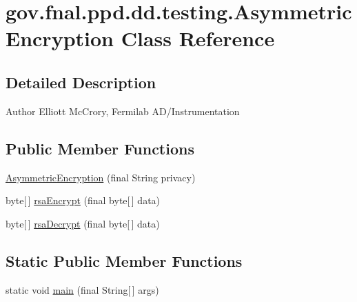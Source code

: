 \hypertarget{classgov_1_1fnal_1_1ppd_1_1dd_1_1testing_1_1AsymmetricEncryption}{\section{gov.\-fnal.\-ppd.\-dd.\-testing.\-Asymmetric\-Encryption Class Reference}
\label{classgov_1_1fnal_1_1ppd_1_1dd_1_1testing_1_1AsymmetricEncryption}
}


\subsection{Detailed Description}
\begin{DoxyAuthor}{Author}
Elliott Mc\-Crory, Fermilab A\-D/\-Instrumentation 
\end{DoxyAuthor}
\subsection*{Public Member Functions}
\begin{DoxyCompactItemize}
\item 
\hyperlink{classgov_1_1fnal_1_1ppd_1_1dd_1_1testing_1_1AsymmetricEncryption_a5272341af392c74c910ce0874523defe}{Asymmetric\-Encryption} (final String privacy)
\item 
byte\mbox{[}$\,$\mbox{]} \hyperlink{classgov_1_1fnal_1_1ppd_1_1dd_1_1testing_1_1AsymmetricEncryption_a3d19fa6b578aead37afe4328881fe467}{rsa\-Encrypt} (final byte\mbox{[}$\,$\mbox{]} data)
\item 
byte\mbox{[}$\,$\mbox{]} \hyperlink{classgov_1_1fnal_1_1ppd_1_1dd_1_1testing_1_1AsymmetricEncryption_ae076c4919f79815cebae79ca1b62066a}{rsa\-Decrypt} (final byte\mbox{[}$\,$\mbox{]} data)
\end{DoxyCompactItemize}
\subsection*{Static Public Member Functions}
\begin{DoxyCompactItemize}
\item 
static void \hyperlink{classgov_1_1fnal_1_1ppd_1_1dd_1_1testing_1_1AsymmetricEncryption_ae24fff0243749113cb3c1c4c348b8cc3}{main} (final String\mbox{[}$\,$\mbox{]} args)
\end{DoxyCompactItemize}


